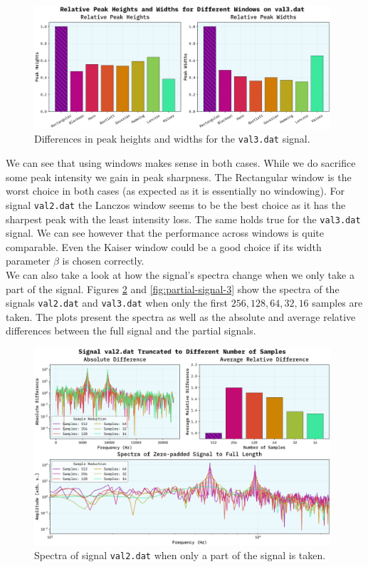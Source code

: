 \documentclass[10pt, titlepage, a4paper]{article}
\begin{document}
\begin{figure}[H]
    \centering
    \includegraphics[width=0.98\textwidth]{../SpectralAnalysis/Images/peak-widths-val3.dat.png}
    \caption{Differences in peak heights and widths for the \texttt{val3.dat} signal.}
    \label{fig:peak-differences-3}
\end{figure}

We can see that using windows makes sense in both cases. While we do sacrifice some peak intensity we gain in peak sharpness.
The Rectangular window is the worst choice in both cases (as expected as it is essentially no windowing). For signal \texttt{val2.dat}
the Lanczos window seems to be the best choice as it has the sharpest peak with the least intensity loss. The same holds true for 
the \texttt{val3.dat} signal. We can see however that the performance across windows is quite comparable. Even the Kaiser window 
could be a good choice if its width parameter $\beta$ is chosen correctly. \\

We can also take a look at how the signal's spectra change when we only take a part of the signal. Figures 
\ref{fig:partial-signal-2} and \ref{fig:partial-signal-3} show the spectra of the signals \texttt{val2.dat} and \texttt{val3.dat} 
when only the first $256, 128, 64, 32, 16$ samples are taken. The plots present the spectra as well as the absolute and average 
relative differences between the full signal and the partial signals.

\begin{figure}[H]
    \centering
    \includegraphics[width=0.98\textwidth]{../SpectralAnalysis/Images/reduced-samples-val2.dat.png}
    \caption{Spectra of signal \texttt{val2.dat} when only a part of the signal is taken.}
    \label{fig:partial-signal-2}
\end{figure}
\end{document}

